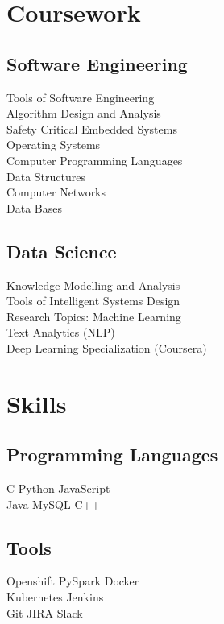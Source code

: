 \documentclass[]{deedy-resume-openfont}
\begin{document}
\begin{minipage}[t]{0.33\textwidth}

\section{Coursework}
\subsection{Software Engineering}
Tools of Software Engineering \\
Algorithm Design and Analysis\\
Safety Critical Embedded Systems \\
Operating Systems \\
Computer Programming Languages \\
Data Structures \\
Computer Networks \\
Data Bases \\
\sectionsep

\subsection{Data Science}
Knowledge Modelling and Analysis \\
Tools of Intelligent Systems Design \\
Research Topics: Machine Learning \\
Text Analytics (NLP) \\
Deep Learning Specialization (Coursera)
\sectionsep


\section{Skills}
\subsection{Programming Languages}
\textbullet{} C \textbullet{} Python \textbullet{} JavaScript \\

\textbullet{} Java \textbullet{} MySQL \textbullet{} C++
\sectionsep
\subsection{Tools}
\textbullet{} Openshift \textbullet{} PySpark \textbullet{}  Docker \\
\textbullet{} Kubernetes \textbullet{} Jenkins \\
 \textbullet{} Git \textbullet{} JIRA \textbullet{} Slack 

\sectionsep

%
%

\end{minipage} 
\end{document}
